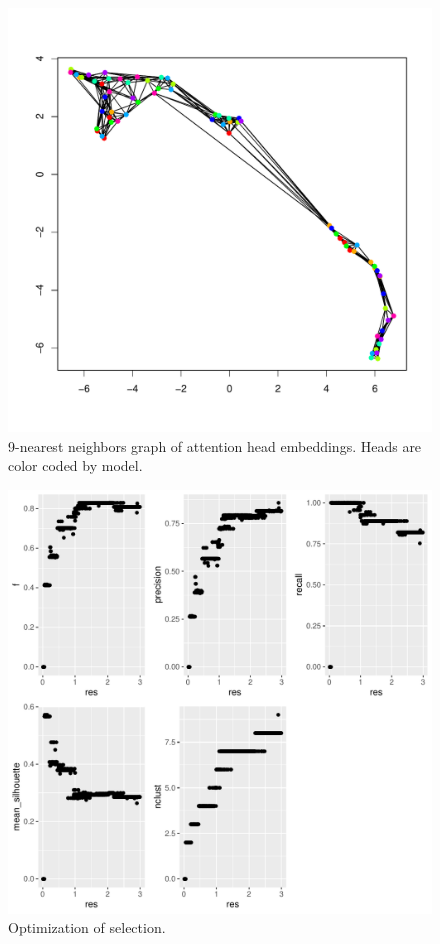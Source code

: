 \documentclass{article}
\begin{document}
\begin{figure}
	\includegraphics[width=\textwidth]{figs/knn.pdf}
	\caption{9-nearest neighbors graph of attention head embeddings. Heads are color coded by model.}
	\label{}
\end{figure}

\begin{figure}
	\includegraphics[width=\textwidth]{figs/optimization.pdf}
	\caption{Optimization of \gamma selection.}
	\label{}
\end{figure}
\end{document}
